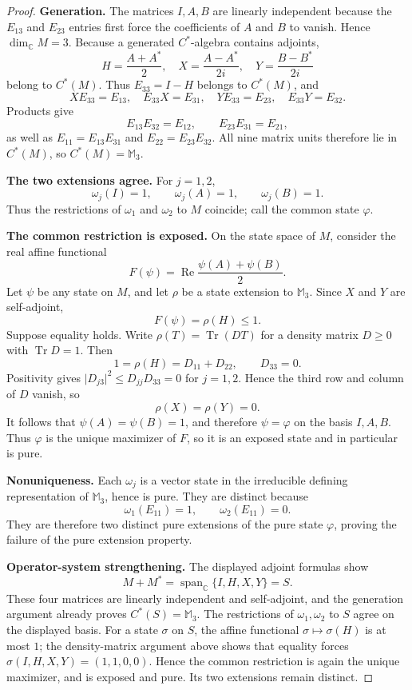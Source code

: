\documentclass[11pt]{article}
\newcommand{\Mthree}{\mathbb M_3}
\newcommand{\Cstar}{C^*}
\DeclareMathOperator{\spanop}{span}
\begin{document}
\begin{proof}
\textbf{Generation.}
The matrices \(I,A,B\) are linearly independent because the \(E_{13}\) and
\(E_{23}\) entries first force the coefficients of \(A\) and \(B\) to
vanish.  Hence \(\dim_{\mathbb C}M=3\).
Because a generated \(C^*\)-algebra contains adjoints,
\[
 H=\frac{A+A^*}{2},\quad X=\frac{A-A^*}{2i},\quad
 Y=\frac{B-B^*}{2i}
\]
belong to \(\Cstar(M)\).  Thus \(E_{33}=I-H\) belongs to \(\Cstar(M)\), and
\[
 XE_{33}=E_{13},\quad E_{33}X=E_{31},\quad
 YE_{33}=E_{23},\quad E_{33}Y=E_{32}.
\]
Products give
\[
 E_{13}E_{32}=E_{12},\qquad E_{23}E_{31}=E_{21},
\]
as well as \(E_{11}=E_{13}E_{31}\) and
\(E_{22}=E_{23}E_{32}\).  All nine matrix units therefore lie in
\(\Cstar(M)\), so \(\Cstar(M)=\Mthree\).

\textbf{The two extensions agree.}
For \(j=1,2\),
\[
 \omega_j(I)=1,\qquad \omega_j(A)=1,\qquad \omega_j(B)=1.
\]
Thus the restrictions of \(\omega_1\) and \(\omega_2\) to \(M\) coincide;
call the common state \(\varphi\).

\textbf{The common restriction is exposed.}
On the state space of \(M\), consider the real affine functional
\[
 F(\psi)=\operatorname{Re}\frac{\psi(A)+\psi(B)}2.
\]
Let \(\psi\) be any state on \(M\), and let \(\rho\) be a state extension to
\(\Mthree\).  Since \(X\) and \(Y\) are self-adjoint,
\[
 F(\psi)=\rho(H)\leq 1.
\]
Suppose equality holds.  Write
\(\rho(T)=\operatorname{Tr}(DT)\) for a density matrix \(D\geq0\) with
\(\operatorname{Tr}D=1\).  Then
\[
 1=\rho(H)=D_{11}+D_{22},\qquad D_{33}=0.
\]
Positivity gives
\(\lvert D_{j3}\rvert^2\leq D_{jj}D_{33}=0\) for \(j=1,2\).  Hence the third
row and column of \(D\) vanish, so
\[
 \rho(X)=\rho(Y)=0.
\]
It follows that \(\psi(A)=\psi(B)=1\), and therefore \(\psi=\varphi\) on the
basis \(I,A,B\).  Thus \(\varphi\) is the unique maximizer of \(F\), so it is
an exposed state and in particular is pure.

\textbf{Nonuniqueness.}
Each \(\omega_j\) is a vector state in the irreducible defining
representation of \(\Mthree\), hence is pure.  They are distinct because
\[
 \omega_1(E_{11})=1,\qquad \omega_2(E_{11})=0.
\]
They are therefore two distinct pure extensions of the pure state
\(\varphi\), proving the failure of the pure extension property.

\textbf{Operator-system strengthening.}
The displayed adjoint formulas show
\[
 M+M^*=\spanop_{\mathbb C}\{I,H,X,Y\}=S.
\]
These four matrices are linearly independent and self-adjoint, and the
generation argument already proves \(\Cstar(S)=\Mthree\).  The restrictions
of \(\omega_1,\omega_2\) to \(S\) agree on the displayed basis.  For a state
\(\sigma\) on \(S\), the affine functional \(\sigma\mapsto\sigma(H)\) is at
most \(1\); the density-matrix argument above shows that equality forces
\(\sigma(I,H,X,Y)=(1,1,0,0)\).  Hence the common restriction is again the
unique maximizer, and is exposed and pure.  Its two extensions remain
distinct.
\end{proof}
\end{document}
